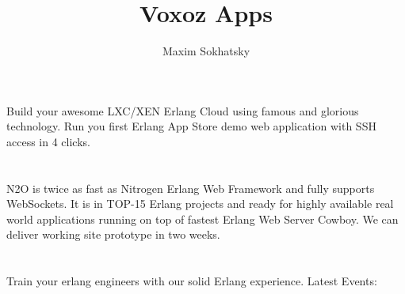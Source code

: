 \documentclass[11pt]{article}
\begin{document}

\title{Voxoz Apps}
\author{Maxim Sokhatsky}



\section*{}
\paragraph{}
Build your awesome LXC/XEN Erlang Cloud using famous  and glorious  technology.
Run you first Erlang App Store demo web application with SSH access in 4 clicks.

\section*{}
\paragraph{}
N2O is twice as fast as Nitrogen Erlang Web Framework and fully supports WebSockets.
It is in TOP-15 Erlang projects and ready for highly available real world applications running on top of fastest Erlang Web Server Cowboy.
We can deliver working site prototype in two weeks.

\section*{}
\paragraph{}
Train your erlang engineers with our solid Erlang experience.
Latest Events:
\paragraph{}
\end{document}
